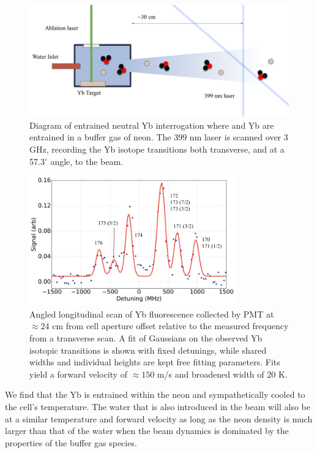 \begin{figure}[H]
	\centering
	\includegraphics[width=\textwidth]{images/Yb_interrogation.pdf}
	\caption{Diagram of entrained neutral Yb interrogation where  and Yb are entrained in a buffer gas of neon. The 399 nm laser is scanned over 3 GHz, recording the Yb isotope transitions both transverse, and at a 57.3$^\circ$ angle, to the beam.}
	\label{fig: Yb interrogation}
\end{figure}


\begin{figure}[H]
	\centering
	\includegraphics[width=0.8\textwidth]{images/CBGB_Yb_spectrum_long_labeled.png}
	\caption{Angled longitudinal scan of Yb fluorescence collected by PMT at $\approx 24$ cm from cell aperture offset relative to the measured  frequency from a transverse scan. A fit of Gaussians on the observed Yb isotopic transitions is shown with fixed detunings, while shared widths and individual heights are kept free fitting parameters. Fits yield a forward velocity of $\approx 150$ m/s and broadened width of 20 K.}
	\label{fig: yb spectrum}
\end{figure}

We find that the Yb is entrained within the neon and sympathetically cooled to the cell's temperature. The water that is also introduced in the beam will also be at a similar temperature and forward velocity as long as the neon density is much larger than that of the water when the beam dynamics is dominated by the properties of the buffer gas species.
